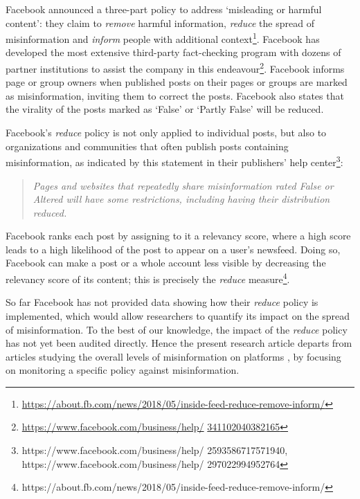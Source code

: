 \documentclass[11pt,a4paper]{article}
\begin{document}
Facebook announced a three-part policy to address ‘misleading or harmful content’: they claim to \textit{remove} harmful information, \textit{reduce} the spread of misinformation and \textit{inform} people with additional context\footnote{\href{https://about.fb.com/news/2018/05/inside-feed-reduce-remove-inform/}{https://about.fb.com/news/2018/05/inside-feed-reduce-remove-inform/}}. 
Facebook has developed the most extensive third-party fact-checking program with dozens of partner institutions to assist the company in this endeavour\footnote{\href{https://www.facebook.com/business/help/341102040382165}{https://www.facebook.com/business/help/} \href{https://www.facebook.com/business/help/341102040382165}{341102040382165}}.
Facebook informs page or group owners when published posts on their pages or groups are marked as misinformation, inviting them to correct the posts.
Facebook also states that the virality of the posts marked as `False' or `Partly False' will be reduced.

Facebook’s \textit{reduce} policy is not only applied to individual posts, but also to organizations and communities that often publish posts containing misinformation, as indicated by this statement in their publishers’ help center\footnote{https://www.facebook.com/business/help/ 2593586717571940, https://www.facebook.com/business/help/ 297022994952764}: 
\begin{quote}
\emph{Pages and websites that repeatedly share misinformation rated False or Altered will have some restrictions, including having their distribution reduced.}
\end{quote}
Facebook ranks each post by assigning to it a relevancy score, where a high score leads to a high likelihood of the post to appear on a user's newsfeed. 
Doing so, Facebook can make a post or a whole account less visible by decreasing the relevancy score of its content; this is precisely the {\it reduce} measure\footnote{https://about.fb.com/news/2018/05/inside-feed-reduce-remove-inform/}.

So far Facebook has not provided data showing how their {\it reduce} policy is implemented, which would allow researchers to quantify its impact on the spread of misinformation. 
To the best of our knowledge, the impact of the {\it reduce} policy has not yet been audited directly.
Hence the present research article departs from articles studying the overall levels of misinformation on platforms \citep{allcott2019trends, kornbluh2020new, resnick2018iffy}, by focusing on monitoring a specific policy against misinformation.
\end{document}
